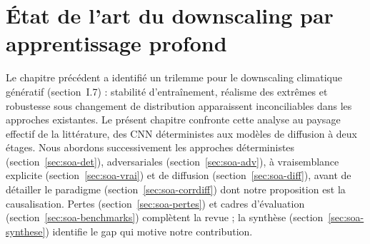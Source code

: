 \chapter{État de l'art du downscaling par apprentissage profond}
\label{chap:etatdelart}


\vspace{1.5em}

\label{sec:soa-intro}

Le chapitre précédent a identifié un trilemme pour le downscaling climatique génératif (section~I.7) : stabilité d'entraînement, réalisme des extrêmes et robustesse sous changement de distribution apparaissent inconciliables dans les approches existantes. Le présent chapitre confronte cette analyse au paysage effectif de la littérature, des CNN déterministes aux modèles de diffusion à deux étages. Nous abordons successivement les approches déterministes (section~\ref{sec:soa-det}), adversariales (section~\ref{sec:soa-adv}), à vraisemblance explicite (section~\ref{sec:soa-vrai}) et de diffusion (section~\ref{sec:soa-diff}), avant de détailler le paradigme \CorrDiff{} (section~\ref{sec:soa-corrdiff}) dont notre proposition est la causalisation. Pertes (section~\ref{sec:soa-pertes}) et cadres d'évaluation (section~\ref{sec:soa-benchmarks}) complètent la revue ; la synthèse (section~\ref{sec:soa-synthese}) identifie le gap qui motive notre contribution.

